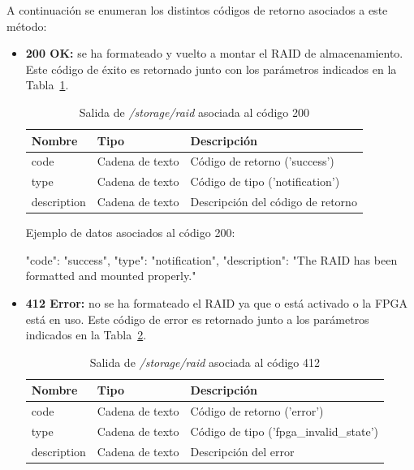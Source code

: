 A continuación se enumeran los distintos códigos de retorno asociados a este método:
\begin{itemize}

\item{\textbf{200 OK:} se ha formateado y vuelto a montar el \gls{RAID} de almacenamiento.
Este código de éxito es retornado junto con los parámetros indicados en la Tabla~\ref{extra:api:storageraid:ok}.
\begin{table}[H]
\centering
\begin{tabular}{|l|l|l|}
\hline
\rowcolor[HTML]{F5F5F5}
\textbf{Nombre}  & \textbf{Tipo}   & \textbf{Descripción}              \\ \hline
code             & Cadena de texto & Código de retorno ('success')     \\ \hline
type             & Cadena de texto & Código de tipo ('notification')   \\ \hline
description      & Cadena de texto & Descripción del código de retorno \\ \hline
\end{tabular}
\caption{Salida de \textit{/storage/raid} asociada al código 200}
\label{extra:api:storageraid:ok}
\end{table}
\begin{minipage}{\textwidth}
Ejemplo de datos asociados al código 200:

\begin{code}[language=json]
{
  "code": "success",
  "type": "notification",
  "description": "The RAID has been formatted and mounted properly."
}
\end{code}
\end{minipage}
}

\item{\textbf{412 Error:} no se ha formateado el \gls{RAID} ya que o está activado o la \gls{FPGA} está en uso.
Este código de error es retornado junto a los parámetros indicados en la Tabla~\ref{extra:api:storageraid:error}.
\begin{table}[H]
\centering
\begin{tabular}{|l|l|l|}
\hline
\rowcolor[HTML]{F5F5F5}
\textbf{Nombre}  & \textbf{Tipo}   & \textbf{Descripción}                    \\ \hline
code             & Cadena de texto & Código de retorno ('error')             \\ \hline
type             & Cadena de texto & Código de tipo ('fpga\_invalid\_state') \\ \hline
description      & Cadena de texto & Descripción del error                   \\ \hline
\end{tabular}
\caption{Salida de \textit{/storage/raid} asociada al código 412}
\label{extra:api:storageraid:error}
\end{table}

}
\end{itemize}
